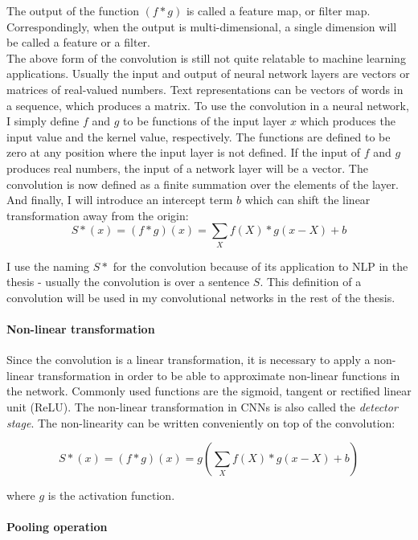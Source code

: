 The output of the function $(f * g)$ is called a feature map, or filter map. Correspondingly, when the output is multi-dimensional, a single dimension will be called a feature or a filter.\\

The above form of the convolution is still not quite relatable to machine learning applications. Usually the input and output of neural network layers are vectors or matrices of real-valued numbers. Text representations can be vectors of words in a sequence, which produces a matrix. To use the convolution in a neural network, I simply define $f$ and $g$ to be functions of the input layer $x$ which produces the input value and the kernel value, respectively. The functions are defined to be zero at any position where the input layer is not defined. 
If the input of $f$ and $g$ produces real numbers, the input of a network layer will be a vector. The convolution is now defined as a finite summation over the elements of the layer. And finally, I will introduce an intercept term $b$ which can shift the linear transformation away from the origin: 
$$
S*(x) = (f*g)(x) = \sum_X f(X) * g(x-X) + b
$$

I use the naming $S*$ for the convolution because of its application to NLP in the thesis - usually the convolution is over a sentence $S$.
This definition of a convolution will be used in my convolutional networks in the rest of the thesis.

\paragraph{Non-linear transformation}

Since the convolution is a linear transformation, it is necessary to apply a non-linear transformation in order to be able to approximate non-linear functions in the network\cite{any_function}. Commonly used functions are the sigmoid, tangent or rectified linear unit (ReLU). The non-linear transformation in CNNs is also called the \emph{detector stage}. The non-linearity can be written conveniently on top of the convolution:

$$
S*(x) = (f*g)(x) = g(\sum_X f(X) * g(x-X) + b)
$$

where $g$ is the activation function. 


\paragraph{Pooling operation}

